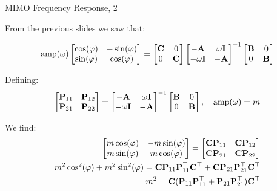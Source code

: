 \documentclass{beamer}
\begin{document}
\begin{frame}{MIMO Frequency Response, 2}
	\begin{flushleft}
		
		From the previous slides we saw that:
		
		\begin{align*}
			 \text{amp}(\omega)
			\begin{bmatrix}
				\cos(\varphi) & -\sin(\varphi) \\
				\sin(\varphi) & \cos(\varphi)
			\end{bmatrix}
			= 
			\begin{bmatrix}
				\mathbf{C} & 0 \\  0 & \mathbf{C}
			\end{bmatrix}
			\begin{bmatrix}
				-\mathbf{A} & \omega \mathbf{I} \\
				-\omega \mathbf{I} & -\mathbf{A}
			\end{bmatrix}^{-1}
			\begin{bmatrix}
				\mathbf{B} & 0 \\  0 & \mathbf{B}
			\end{bmatrix}
		\end{align*}		
		
		Defining:
		\begin{align}
			\begin{bmatrix}
				\mathbf{P} _{11} & \mathbf{P} _{12} \\
				\mathbf{P} _{21} & \mathbf{P} _{22}
			\end{bmatrix}
			= 
			\begin{bmatrix}
				-\mathbf{A} & \omega \mathbf{I} \\
				-\omega \mathbf{I} & -\mathbf{A}
			\end{bmatrix}^{-1}
			\begin{bmatrix}
				\mathbf{B} & 0 \\  0 & \mathbf{B}
			\end{bmatrix},
			\ \ \
			\text{amp}(\omega) = m
		\end{align}		
		
		We find:
		\begin{align}
			\begin{bmatrix}
				m\cos(\varphi) & -m\sin(\varphi) \\
				m\sin(\varphi) & m\cos(\varphi)
			\end{bmatrix}
			= 
			\begin{bmatrix}
			\mathbf{C}\mathbf{P} _{11} & \mathbf{C}\mathbf{P} _{12} \\
			\mathbf{C}\mathbf{P} _{21} & \mathbf{C}\mathbf{P} _{22}
			\end{bmatrix}
			\\
			m^2\cos^2(\varphi) + m^2\sin^2(\varphi)
		= 
		\mathbf{C}\mathbf{P} _{11} \mathbf{P} _{11}^\top \mathbf{C}^\top + 
		\mathbf{C}\mathbf{P} _{21} \mathbf{P} _{21}^\top \mathbf{C}^\top
		\\
		m^2
		= 
		\mathbf{C}(\mathbf{P} _{11} \mathbf{P} _{11}^\top +\mathbf{P} _{21} \mathbf{P} _{21}^\top  )\mathbf{C}^\top
		\end{align}		
		
		
		
	\end{flushleft}
\end{frame}
\end{document}
